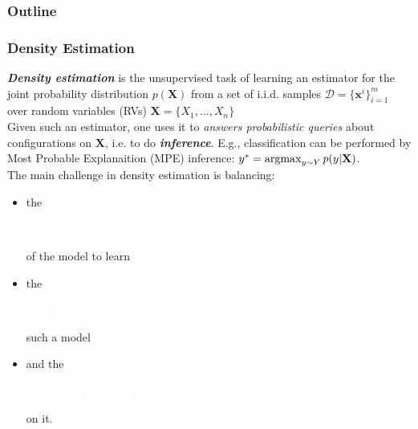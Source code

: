 \documentclass[xcolor={usenames,dvipsnames,svgnames}, compress]{beamer}
\newcommand{\argmax}{\operatornamewithlimits{argmax}}
\newcommand{\highlighttext}[2][yellow]{{\colorbox{#1}{\strut\textcolor{white}{#2}}}}
\begin{document}
{
  \begin{frame}
    \titlepage
  \end{frame}
}

\begin{frame}[t]
  \frametitle{Outline}
  
\end{frame}


\begin{frame}[t]
  \frametitle{Density Estimation}
  \small
  \emph{\textbf{Density estimation}} is the unsupervised task of
    learning an estimator for the joint probability distribution
    $p(\mathbf{X})$ from a set of i.i.d. samples $\mathcal{D}=\{\mathbf
    x^i\}_{i=1}^m$ over random variables (RVs) $\mathbf{X}=\{X_{1},\dots,X_{n}\}$\\[17pt]
    
    Given such an estimator, one uses it to \emph{answers
    probabilistic queries} about configurations on $\mathbf{X}$,
  i.e. to do \emph{\textbf{inference}}.
  E.g., classification can be performed by Most Probable Explanaition
  (MPE) inference: $y^{*}=\argmax_{y\sim Y}p(y|\mathbf{X})$.
  \\[17pt]

    The main challenge in density estimation is balancing:
    \begin{itemize}
      \setlength\itemsep{-3pt}
    \item the \highlighttext[lacamlilac]{\textbf{\emph{representation
            expressiveness}}} of the model to learn
    \item the \highlighttext[gold4]{\textbf{\emph{cost of learning}}}
      such a model
      \item and the \highlighttext[petroil2]{\textbf{\emph{cost of performing inference}}} on it.
    \end{itemize}

\end{frame}
\end{document}
